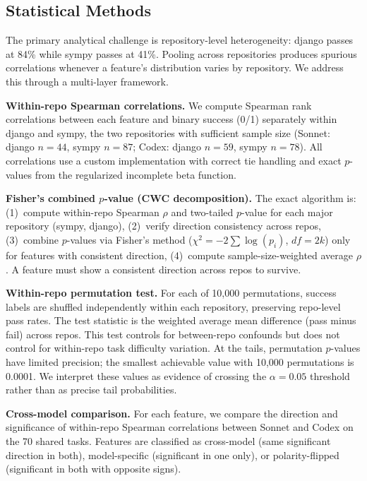 \documentclass[11pt]{article}
\begin{document}
\subsection{Statistical Methods}
\label{sec:stats}

The primary analytical challenge is repository-level heterogeneity: django passes at 84\% while sympy passes at 41\%.
Pooling across repositories produces spurious correlations whenever a feature's distribution varies by repository.
We address this through a multi-layer framework.

\textbf{Within-repo Spearman correlations.}
We compute Spearman rank correlations between each feature and binary success (0/1) separately within django and sympy, the two repositories with sufficient sample size (Sonnet: django $n = 44$, sympy $n = 87$; Codex: django $n = 59$, sympy $n = 78$).
All correlations use a custom implementation with correct tie handling and exact $p$-values from the regularized incomplete beta function.

\textbf{Fisher's combined $p$-value (CWC decomposition).}
The exact algorithm is: (1)~compute within-repo Spearman $\rho$ and two-tailed $p$-value for each major repository (sympy, django), (2)~verify direction consistency across repos, (3)~combine $p$-values via Fisher's method ($\chi^2 = -2 \sum \log(p_i)$, $df = 2k$) only for features with consistent direction, (4)~compute sample-size-weighted average $\rho$.
A feature must show a consistent direction across repos to survive.

\textbf{Within-repo permutation test.}
For each of 10,000 permutations, success labels are shuffled independently within each repository, preserving repo-level pass rates.
The test statistic is the weighted average mean difference (pass minus fail) across repos.
This test controls for between-repo confounds but does not control for within-repo task difficulty variation.
At the tails, permutation $p$-values have limited precision; the smallest achievable value with 10,000 permutations is 0.0001.
We interpret these values as evidence of crossing the $\alpha = 0.05$ threshold rather than as precise tail probabilities.

\textbf{Cross-model comparison.}
For each feature, we compare the direction and significance of within-repo Spearman correlations between Sonnet and Codex on the 70 shared tasks.
Features are classified as cross-model (same significant direction in both), model-specific (significant in one only), or polarity-flipped (significant in both with opposite signs).
\end{document}
